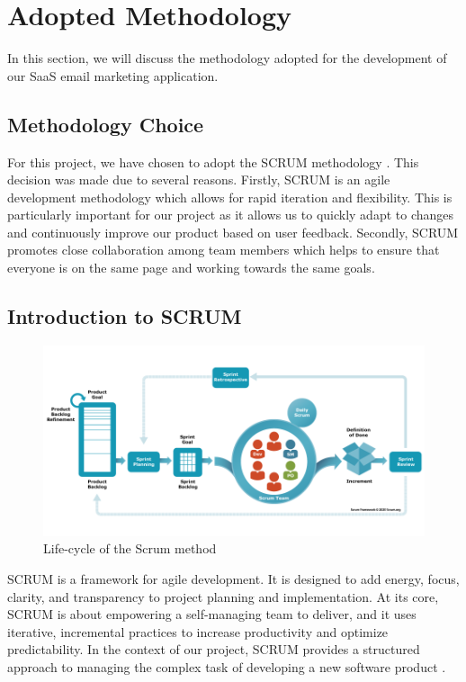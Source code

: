 \section{Adopted Methodology}

In this section, we will discuss the methodology adopted for the development of our SaaS email marketing application.

\subsection{Methodology Choice}

For this project, we have chosen to adopt the SCRUM methodology \cite{scrum}. This decision was made due to several reasons. Firstly, SCRUM is an agile development methodology which allows for rapid iteration and flexibility. This is particularly important for our project as it allows us to quickly adapt to changes and continuously improve our product based on user feedback. Secondly, SCRUM promotes close collaboration among team members which helps to ensure that everyone is on the same page and working towards the same goals.

\subsection{Introduction to SCRUM}

\begin{figure}[ht]
    \centering
    \includegraphics[width=0.6\linewidth]{Images//images/scrum.png}
    \caption{Life-cycle of the Scrum method}
    \label{fig:Life-cycle of the Scrum method}
\end{figure}

SCRUM is a framework for agile development. It is designed to add energy, focus, clarity, and transparency to project planning and implementation. At its core, SCRUM is about empowering a self-managing team to deliver, and it uses iterative, incremental practices to increase productivity and optimize predictability. In the context of our project, SCRUM provides a structured approach to managing the complex task of developing a new software product \cite{scrum}.

